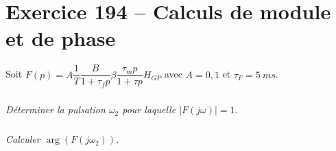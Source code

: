 \section*{Exercice 194 -- Calculs de module et de phase}
\setcounter{exo}{0}


Soit $F(p)=A\dfrac{1}{T}\dfrac{B}{1+\tau_f p}\beta \dfrac{\tau_m p}{1+\tau p} H_{GP}$ avec $A=0,1$ et $\tau_F=\SI{5}{ms}$.


\subparagraph{}
\textit{Déterminer la pulsation $\omega_2$ pour laquelle $\left| F(j\omega) \right|=1.$}

\subparagraph{}
\textit{Calculer $\arg \left(F(j\omega_2)\right)$.}

